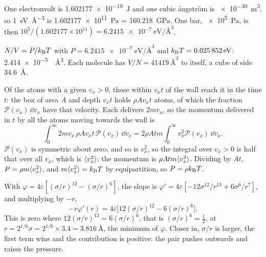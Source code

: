 \label{sec:pr-solutions}

One electronvolt is \SI{1.602177e-19}{\joule} and
one cubic ångström is \SI{e-30}{\metre\cubed}, so
\SI{1}{\electronvolt\per\angstrom\cubed} is
\SI{1.602177e11}{\pascal} = \SI{160.218}{\giga\pascal}. One bar,
\SI{e5}{\pascal}, is then $10^5/(1.602177\times10^{11}) =
\SI{6.2415e-7}{\electronvolt\per\angstrom\cubed}$.

$N/V = P/k_{\mathrm{B}} T$ with $P =
\SI{6.2415e-7}{\electronvolt\per\angstrom\cubed}$ and $k_{\mathrm{B}} T =
\SI{0.025852}{\electronvolt}$: \SI{2.414e-5}{\per\angstrom\cubed}. Each
molecule has $V/N = \SI{41419}{\angstrom\cubed}$ to itself, a cube of side
\SI{34.6}{\angstrom}.

Of the atoms with a given $v_x > 0$, those within
$v_xt$ of the wall reach it in the time $t$: the box of area $A$ and depth
$v_xt$ holds $\rho Av_xt$ atoms, of which the fraction $\mathcal{P}(v_x)\,
\dd v_x$ have that velocity. Each delivers $2mv_x$, so the momentum
delivered in $t$ by all the atoms moving towards the wall is
\begin{equation*}
   \int_0^\infty2mv_x\,\rho Av_xt\,\mathcal{P}(v_x)\,\dd v_x
   = 2\rho Atm\int_0^\infty v_x^2\mathcal{P}(v_x)\,\dd v_x .
\end{equation*}
$\mathcal{P}(v_x)$ is symmetric about zero, and so is $v_x^2$, so the
integral over $v_x > 0$ is half that over all $v_x$, which is
$\langle v_x^2 \rangle$; the momentum is $\rho Atm\langle v_x^2 \rangle$. Dividing by $At$,
$P = \rho m\langle v_x^2 \rangle$, and $m\langle v_x^2 \rangle = k_{\mathrm{B}} T$ by equipartition, so $P
= \rho k_{\mathrm{B}} T$.

With $\varphi = 4\varepsilon[(\sigma/r)^{12} -
(\sigma/r)^6]$, the slope is $\varphi' = 4\varepsilon[-12\sigma^{12}/r^{13}
+ 6\sigma^6/r^7]$, and multiplying by $-r$,
\begin{equation*}
   -r\varphi'(r) = 4\varepsilon\bigl[12(\sigma/r)^{12} -
   6(\sigma/r)^6\bigr] .
\end{equation*}
This is zero where $12(\sigma/r)^{12} = 6(\sigma/r)^6$, that is
$(\sigma/r)^6 = \frac12$, at $r = 2^{1/6}\sigma = 2^{1/6}\times3.4 =
\SI{3.816}{\angstrom}$, the minimum of $\varphi$. Closer in, $\sigma/r$ is
larger, the first term wins and the contribution is positive: the pair
pushes outwards and raises the pressure.

